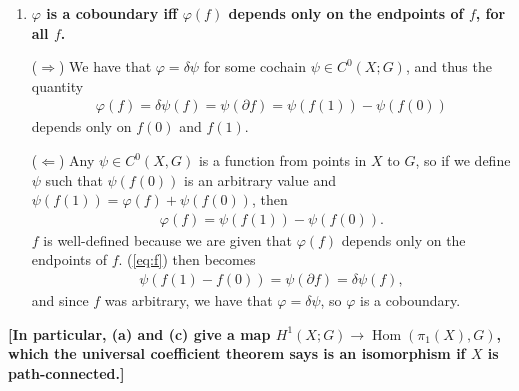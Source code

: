 \documentclass[12pt]{article}
\DeclareMathOperator{\Hom}{Hom}
\begin{document}
\begin{enumerate}
\begin{enumerate}
            \item
                \boldmath\textbf{$\varphi$ is a coboundary iff $\varphi(f)$ depends only on the endpoints of $f$, for all $f$.
                }\unboldmath \par
                ($\Rightarrow$) We have that $\varphi = \delta\psi$ for some cochain $\psi \in C^0(X; G)$, and thus the quantity
                \begin{align*}
                    \varphi(f) = \delta\psi(f) = \psi(\partial f) = \psi(f(1)) - \psi(f(0))
                \end{align*}
                depends only on $f(0)$ and $f(1)$. \par
                ($\Leftarrow$) Any $\psi \in C^0(X, G)$ is a function from points in $X$ to $G$, so if we define $\psi$ such that $\psi(f(0))$ is an arbitrary value and $\psi(f(1)) = \varphi(f) + \psi(f(0))$, then
                \begin{align} \label{eq:f}
                    \varphi(f) = \psi(f(1)) - \psi(f(0)).
                \end{align}
                $f$ is well-defined because we are given that $\varphi(f)$ depends only on the endpoints of $f$. (\ref{eq:f}) then becomes
                \begin{align*}
                    \psi(f(1) - f(0)) = \psi(\partial f) = \delta\psi(f),
                \end{align*}
                and since $f$ was arbitrary, we have that $\varphi = \delta\psi$, so $\varphi$ is a coboundary.
        \end{enumerate}
        \boldmath\textbf{[In particular, (a) and (c) give a map $H^1(X; G) \to \Hom(\pi_1(X), G)$, which the universal coefficient theorem says is an isomorphism if $X$ is path-connected.]
        }\unboldmath \par


\end{enumerate}
\end{document}
